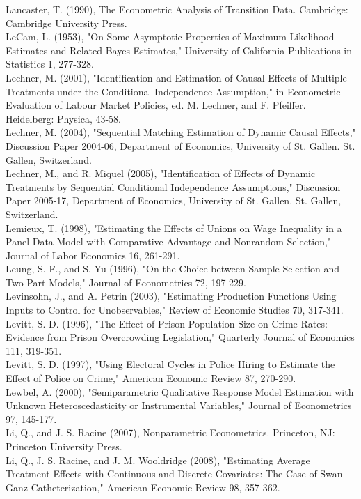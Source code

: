 \documentclass[10pt]{article}
\begin{document}
Lancaster, T. (1990), The Econometric Analysis of Transition Data. Cambridge: Cambridge University Press.\\
LeCam, L. (1953), "On Some Asymptotic Properties of Maximum Likelihood Estimates and Related Bayes Estimates," University of California Publications in Statistics 1, 277-328.\\
Lechner, M. (2001), "Identification and Estimation of Causal Effects of Multiple Treatments under the Conditional Independence Assumption," in Econometric Evaluation of Labour Market Policies, ed. M. Lechner, and F. Pfeiffer. Heidelberg: Physica, 43-58.\\
Lechner, M. (2004), "Sequential Matching Estimation of Dynamic Causal Effects," Discussion Paper 2004-06, Department of Economics, University of St. Gallen. St. Gallen, Switzerland.\\
Lechner, M., and R. Miquel (2005), "Identification of Effects of Dynamic Treatments by Sequential Conditional Independence Assumptions," Discussion Paper 2005-17, Department of Economics, University of St. Gallen. St. Gallen, Switzerland.\\
Lemieux, T. (1998), "Estimating the Effects of Unions on Wage Inequality in a Panel Data Model with Comparative Advantage and Nonrandom Selection," Journal of Labor Economics 16, 261-291.\\
Leung, S. F., and S. Yu (1996), "On the Choice between Sample Selection and Two-Part Models," Journal of Econometrics 72, 197-229.\\
Levinsohn, J., and A. Petrin (2003), "Estimating Production Functions Using Inputs to Control for Unobservables," Review of Economic Studies 70, 317-341.\\
Levitt, S. D. (1996), "The Effect of Prison Population Size on Crime Rates: Evidence from Prison Overcrowding Legislation," Quarterly Journal of Economics 111, 319-351.\\
Levitt, S. D. (1997), "Using Electoral Cycles in Police Hiring to Estimate the Effect of Police on Crime," American Economic Review 87, 270-290.\\
Lewbel, A. (2000), "Semiparametric Qualitative Response Model Estimation with Unknown Heteroscedasticity or Instrumental Variables," Journal of Econometrics 97, 145-177.\\
Li, Q., and J. S. Racine (2007), Nonparametric Econometrics. Princeton, NJ: Princeton University Press.\\
Li, Q., J. S. Racine, and J. M. Wooldridge (2008), "Estimating Average Treatment Effects with Continuous and Discrete Covariates: The Case of Swan-Ganz Catheterization," American Economic Review 98, 357-362.\\
\end{document}
